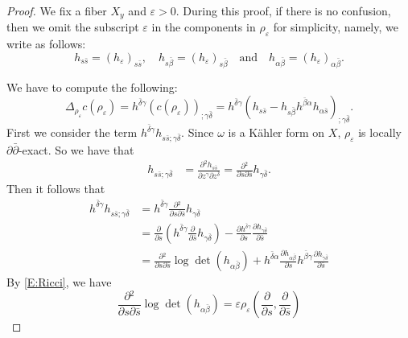 \documentclass{amsart}
\theoremstyle{definition}
\numberwithin{equation}{section}
\begin{document}
\begin{proof}
We fix a fiber $X_y$ and ${\varepsilon}>0$. During this proof, if there is no confusion, then we omit the subscript ${\varepsilon}$ in the components in $\rho_{\varepsilon}$ for simplicity, namely, we write as follows:
\begin{equation*}
h_{s\bar s}=(h_{\varepsilon})_{s\bar s},
\quad
h_{s\bar\beta}=(h_{\varepsilon})_{s\bar\beta}
\quad\text{and}\quad
h_{\alpha\bar\beta}=(h_{\varepsilon})_{\alpha\bar\beta}.
\end{equation*}

We have to compute the following:
\begin{equation*}
\Delta_{\rho_{\varepsilon}} c(\rho_{\varepsilon})
	=h^{\bar\delta\gamma}(c(\rho_{\varepsilon}))_{;\gamma\bar\delta}
	=h^{\bar\delta\gamma}{\left({
	h_{s\bar{s}}-h_{s\bar\beta}h^{\bar\beta\alpha}h_{\alpha\bar{s}}
	}\right)}_{;\gamma\bar\delta}.
\end{equation*}
First we consider the term $h^{\bar\delta\gamma}h_{s\bar{s};\gamma\bar\delta}$. 
Since $\omega$ is a K\"ahler form on $X$, $\rho_{\varepsilon}$ is locally ${\partial\bar\partial}$-exact. So we have that 
\begin{align*}
h_{s\bar{s};\gamma\bar\delta}
	& ={\frac{\partial{^2h_{s\bar{s}}}}{\partial{z^\gamma\partial{z}^{\bar\delta}}}}
	= {\frac{\partial{^2}}{\partial{s\partial\bar{s}}}}h_{\gamma\bar\delta}.
\end{align*}
Then it follows that
\begin{align*}
h^{\bar\delta\gamma}h_{s\bar{s};\gamma\bar\delta}
	& = h^{\bar\delta\gamma}{\frac{\partial{^2}}{\partial{s\partial\bar{s}}}}h_{\gamma\bar\delta} \\
	& = {\frac{\partial{}}{\partial{s}}}{\left({h^{\bar\delta\gamma}{\frac{\partial{}}{\partial{\bar{s}}}}h_{\gamma\bar\delta}}\right)}
	- {\frac{\partial{h^{\bar\delta\gamma}}}{\partial{s}}}{\frac{\partial{h_{\gamma\bar\delta}}}{\partial{\bar{s}}}}
	\\
	& ={\frac{\partial{^2}}{\partial{s\partial\bar{s}}}}\log{\det(h_{\alpha\bar\beta})}
	+h^{\bar\delta\alpha}{\frac{\partial{h_{\alpha\bar\beta}}}{\partial{s}}}
	h^{\bar\beta\gamma}{\frac{\partial{h_{\gamma\bar\delta}}}{\partial{\bar{s}}}}
\end{align*}
By \eqref{E:Ricci}, we have
\begin{equation*}
{\frac{\partial{^2}}{\partial{s\partial\bar{s}}}}\log{\det(h_{\alpha\bar\beta})}
=
{\varepsilon}\rho_{\varepsilon}{\left({{\frac{\partial{}}{\partial{s}}},{\frac{\partial{}}{\partial{\bar s}}}}\right)}

\end{equation*}
\end{proof}
\end{document}
